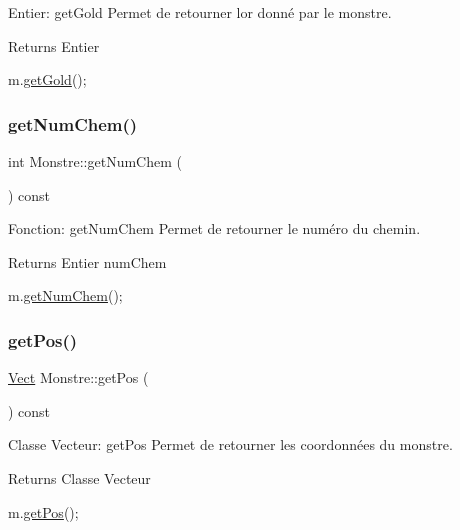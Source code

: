 Entier\+: get\+Gold Permet de retourner l\textquotesingle{}or donné par le monstre. 

\begin{DoxyReturn}{Returns}
Entier 
\begin{DoxyCode}
m.\hyperlink{classMonstre_a4a71cce5e0825e0e331bfdd3538a9b30}{getGold}();
\end{DoxyCode}
 
\end{DoxyReturn}
\mbox{\label{classMonstre_ac7998eae7604e8bbfb9aad3b3ea59c33}} 
\subsubsection{\texorpdfstring{get\+Num\+Chem()}{getNumChem()}}
{\footnotesize\ttfamily int Monstre\+::get\+Num\+Chem (\begin{DoxyParamCaption}{ }\end{DoxyParamCaption}) const}



Fonction\+: get\+Num\+Chem Permet de retourner le numéro du chemin. 

\begin{DoxyReturn}{Returns}
Entier num\+Chem 
\begin{DoxyCode}
m.\hyperlink{classMonstre_ac7998eae7604e8bbfb9aad3b3ea59c33}{getNumChem}();
\end{DoxyCode}
 
\end{DoxyReturn}
\mbox{\label{classMonstre_adbe0edd5d97aef18fb44ef163f368be6}} 
\subsubsection{\texorpdfstring{get\+Pos()}{getPos()}}
{\footnotesize\ttfamily \hyperlink{classVect}{Vect} Monstre\+::get\+Pos (\begin{DoxyParamCaption}{ }\end{DoxyParamCaption}) const}



Classe Vecteur\+: get\+Pos Permet de retourner les coordonnées du monstre. 

\begin{DoxyReturn}{Returns}
Classe Vecteur 
\begin{DoxyCode}
m.\hyperlink{classMonstre_adbe0edd5d97aef18fb44ef163f368be6}{getPos}();
\end{DoxyCode}
 
\end{DoxyReturn}
\mbox{\label{classMonstre_a810f2e49356248d02f7b0e9b8ea16d85}} 
